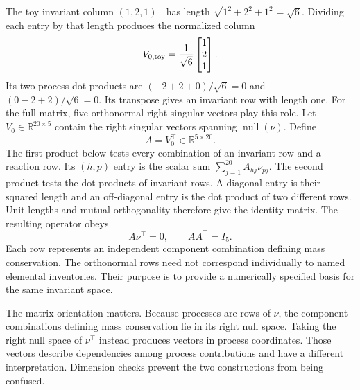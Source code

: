The toy invariant column $(1,2,1)^\top$ has length $\sqrt{1^2+2^2+1^2}=\sqrt6$. Dividing each entry by that length produces the normalized column
\[
V_{0,\rm toy}=\frac1{\sqrt6}\begin{bmatrix}1\\2\\1\end{bmatrix}.
\]
Its two process dot products are $(-2+2+0)/\sqrt6=0$ and $(0-2+2)/\sqrt6=0$. Its transpose gives an invariant row with length one. For the full matrix, five orthonormal right singular vectors play this role. Let $V_0\in\mathbb{R}^{20\times5}$ contain the right singular vectors spanning $\operatorname{null}(\nu)$. Define
\begin{equation}
A=V_0^\top\in\mathbb{R}^{5\times20}.
\label{eq:invariant_basis_definition}
\end{equation}
The first product below tests every combination of an invariant row and a reaction row. Its $(h,p)$ entry is the scalar sum $\sum_{j=1}^{20}A_{hj}\nu_{pj}$. The second product tests the dot products of invariant rows. A diagonal entry is their squared length and an off-diagonal entry is the dot product of two different rows. Unit lengths and mutual orthogonality therefore give the identity matrix. The resulting operator obeys
\begin{equation}
A\nu^\top=0,\qquad AA^\top=I_5.
\label{eq:invariant_basis_properties}
\end{equation}
Each row represents an independent component combination defining mass conservation. The orthonormal rows need not correspond individually to named elemental inventories. Their purpose is to provide a numerically specified basis for the same invariant space.

The matrix orientation matters. Because processes are rows of $\nu$, the component combinations defining mass conservation lie in its right null space. Taking the right null space of $\nu^\top$ instead produces vectors in process coordinates. Those vectors describe dependencies among process contributions and have a different interpretation. Dimension checks prevent the two constructions from being confused.


